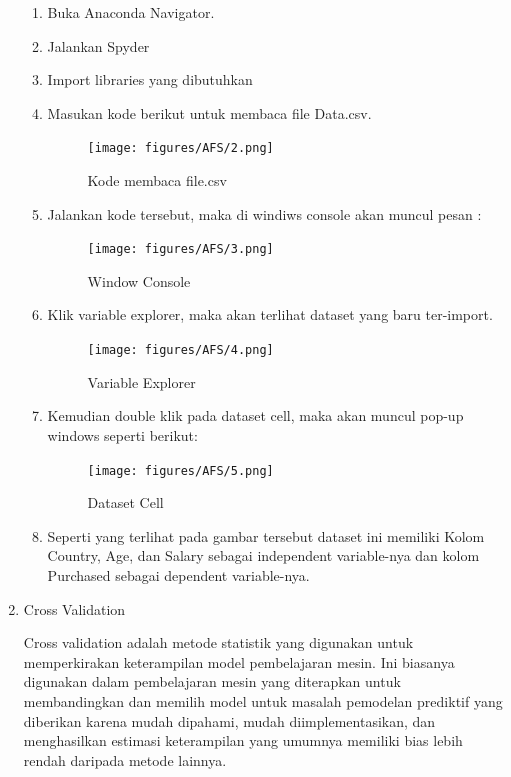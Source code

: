\begin{enumerate}
		\begin{enumerate}
			\item Buka Anaconda Navigator.
			\item Jalankan Spyder
			\item Import libraries yang dibutuhkan
			\item Masukan kode berikut untuk membaca file Data.csv.
				\begin{figure}[ht]
				\centering
				\texttt{[image: figures/AFS/2.png]}
				\caption{Kode membaca file.csv}
				\label{contoh}
				\end{figure}
			\item Jalankan kode tersebut, maka di windiws console akan muncul pesan :
				\begin{figure}[ht]
				\centering
				\texttt{[image: figures/AFS/3.png]}
				\caption{ Window Console}
				\label{contoh}
				\end{figure}
			\item Klik variable explorer, maka akan terlihat dataset yang baru ter-import.
				\begin{figure}[ht]
				\centering
				\texttt{[image: figures/AFS/4.png]}
				\caption{Variable Explorer}
				\label{contoh}
				\end{figure}
			\item Kemudian double klik pada dataset cell, maka akan muncul pop-up windows seperti berikut: 
				\begin{figure}[ht]
				\centering
				\texttt{[image: figures/AFS/5.png]}
				\caption{ Dataset Cell}
				\label{contoh}
				\end{figure}
			\item Seperti yang terlihat pada gambar tersebut dataset ini memiliki Kolom Country, Age, dan Salary sebagai 		   				independent variable-nya dan kolom Purchased sebagai dependent variable-nya.
			
		\end{enumerate}
	

\item Cross Validation \par
Cross validation adalah metode statistik yang digunakan untuk memperkirakan keterampilan model pembelajaran mesin. Ini biasanya digunakan dalam pembelajaran mesin yang diterapkan untuk membandingkan dan memilih model untuk masalah pemodelan prediktif yang diberikan karena mudah dipahami, mudah diimplementasikan, dan menghasilkan estimasi keterampilan yang umumnya memiliki bias lebih rendah daripada metode lainnya.


\end{enumerate}
